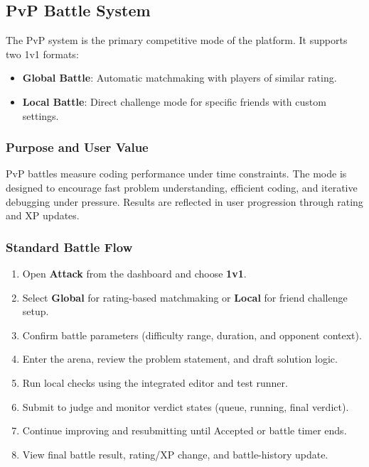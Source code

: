 \documentclass[12pt]{article}
\begin{document}
\subsection{PvP Battle System}

The PvP system is the primary competitive mode of the platform. It supports two 1v1 formats:
\begin{itemize}
\item \textbf{Global Battle}: Automatic matchmaking with players of similar rating.
\item \textbf{Local Battle}: Direct challenge mode for specific friends with custom settings.
\end{itemize}

\subsubsection{Purpose and User Value}

PvP battles measure coding performance under time constraints. The mode is designed to encourage fast problem understanding, efficient coding, and iterative debugging under pressure. Results are reflected in user progression through rating and XP updates.

\subsubsection{Standard Battle Flow}

\begin{enumerate}
\item Open \textbf{Attack} from the dashboard and choose \textbf{1v1}.
\item Select \textbf{Global} for rating-based matchmaking or \textbf{Local} for friend challenge setup.
\item Confirm battle parameters (difficulty range, duration, and opponent context).
\item Enter the arena, review the problem statement, and draft solution logic.
\item Run local checks using the integrated editor and test runner.
\item Submit to judge and monitor verdict states (queue, running, final verdict).
\item Continue improving and resubmitting until Accepted or battle timer ends.
\item View final battle result, rating/XP change, and battle-history update.
\end{enumerate}
\clearpage
\end{document}
